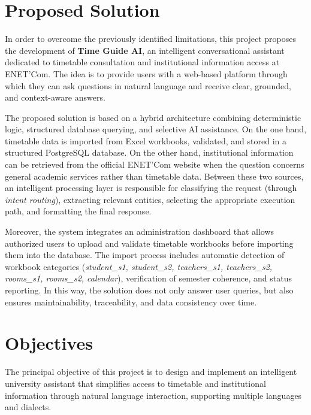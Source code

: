 \section{Proposed Solution}
In order to overcome the previously identified limitations, this project proposes the development of \textbf{Time Guide AI}, an intelligent conversational assistant dedicated to timetable consultation and institutional information access at ENET'Com. The idea is to provide users with a web-based platform through which they can ask questions in natural language and receive clear, grounded, and context-aware answers.

The proposed solution is based on a hybrid architecture combining deterministic logic, structured database querying, and selective AI assistance. On the one hand, timetable data is imported from Excel workbooks, validated, and stored in a structured PostgreSQL database. On the other hand, institutional information can be retrieved from the official ENET'Com website when the question concerns general academic services rather than timetable data. Between these two sources, an intelligent processing layer is responsible for classifying the request (through \textit{intent routing}), extracting relevant entities, selecting the appropriate execution path, and formatting the final response.

Moreover, the system integrates an administration dashboard that allows authorized users to upload and validate timetable workbooks before importing them into the database. The import process includes automatic detection of workbook categories (\textit{student\_s1, student\_s2, teachers\_s1, teachers\_s2, rooms\_s1, rooms\_s2, calendar}), verification of semester coherence, and status reporting. In this way, the solution does not only answer user queries, but also ensures maintainability, traceability, and data consistency over time.

\section{Objectives}
The principal objective of this project is to design and implement an intelligent university assistant that simplifies access to timetable and institutional information through natural language interaction, supporting multiple languages and dialects.

